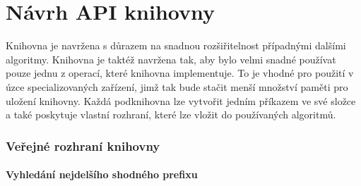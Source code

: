 \chapter{Návrh API knihovny}
Knihovna je navržena s důrazem na snadnou rozšiřitelnost případnými dalšími algoritmy.
Knihovna je taktéž navržena tak, aby bylo velmi snadné používat pouze jednu z operací, které knihovna implementuje.
To je vhodné pro použití v úzce specializovaných zařízení, jimž tak bude stačit menší množství paměti pro uložení knihovny.
Každá podknihovna lze vytvořit jedním příkazem ve své složce a také poskytuje vlastní rozhraní, které lze vložit do používaných algoritmů.

\subsection{Veřejné rozhraní knihovny}

\subsubsection{Vyhledání nejdelšího shodného prefixu}

